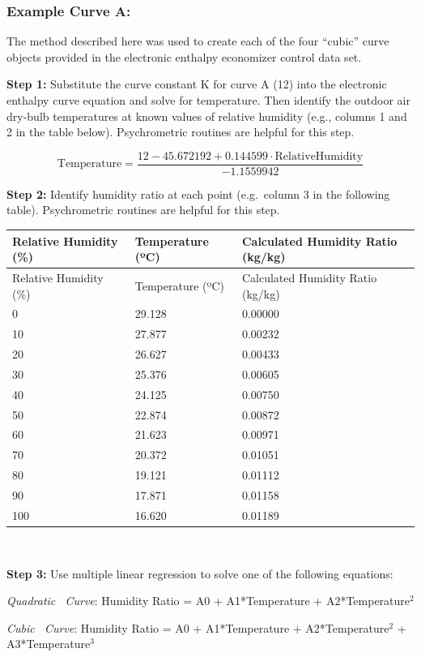 \subsubsection{Example Curve A:}\label{example-curve-a}

The method described here was used to create each of the four ``cubic'' curve objects provided in the electronic enthalpy economizer control data set.

\textbf{Step 1:} Substitute the curve constant K for curve A (12) into the electronic enthalpy curve equation and solve for temperature. Then identify the outdoor air dry-bulb temperatures at known values of relative humidity (e.g., columns 1 and 2 in the table below). Psychrometric routines are helpful for this step.

\begin{equation}
\text{Temperature} = \frac{12 - 45.672192 + 0.144599 \cdot \text{RelativeHumidity}}{-1.1559942}
\end{equation}

\textbf{Step 2:} Identify humidity ratio at each point (e.g.~column 3 in the following table). Psychrometric routines are helpful for this step.

\begin{longtable}[c]{p{1.78in}p{1.5in}p{2.71in}}
\toprule
Relative Humidity (\%) & Temperature (ºC) & Calculated Humidity Ratio (kg/kg) \tabularnewline
\midrule
\endfirsthead

\toprule
Relative Humidity (\%) & Temperature (ºC) & Calculated Humidity Ratio (kg/kg) \tabularnewline
\midrule
\endhead

0 & 29.128 & 0.00000 \tabularnewline
10 & 27.877 & 0.00232 \tabularnewline
20 & 26.627 & 0.00433 \tabularnewline
30 & 25.376 & 0.00605 \tabularnewline
40 & 24.125 & 0.00750 \tabularnewline
50 & 22.874 & 0.00872 \tabularnewline
60 & 21.623 & 0.00971 \tabularnewline
70 & 20.372 & 0.01051 \tabularnewline
80 & 19.121 & 0.01112 \tabularnewline
90 & 17.871 & 0.01158 \tabularnewline
100 & 16.620 & 0.01189 \tabularnewline
\bottomrule
\end{longtable}

\textbf{~}

\textbf{Step 3:} Use multiple linear regression to solve one of the following equations:

\emph{Quadratic~ Curve}: Humidity Ratio = A0 + A1*Temperature + A2*Temperature\(^{2}\)

\emph{Cubic~ Curve}: Humidity Ratio = A0 + A1*Temperature + A2*Temperature\(^{2}\) + A3*Temperature\(^{3}\)

